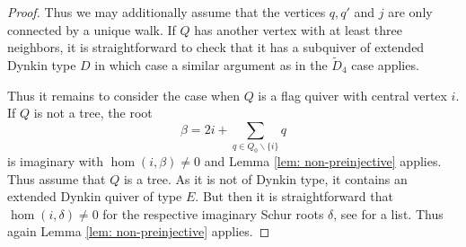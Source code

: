 \documentclass{amsart}
\newcommand{\sayT}[1]{\say[T]{#1}}
\numberwithin{equation}{section}
\begin{document}
\begin{proof}
  Thus we may additionally assume that the vertices $q,q'$ and $j$ are only connected by a unique walk.
  If $Q$ has another vertex with at least three neighbors, it is straightforward to check that it has a subquiver of extended Dynkin type $D$ in which case a similar argument as in the $\tilde D_4$ case applies.\sayT{more precise}

  Thus it remains to consider the case when $Q$ is a flag quiver with central vertex $i$.
  If $Q$ is not a tree, the root 
  $$\beta=2i+\sum_{q\in Q_0\backslash\{i\}}q$$
  is imaginary with $\hom(i,\beta)\neq 0$ and Lemma \ref{lem: non-preinjective} applies.
  Thus assume that $Q$ is a tree.
  As it is not of Dynkin type, it contains an extended Dynkin quiver of type $E$.
  But then it is straightforward that $\hom(i,\delta)\neq 0$ for the respective imaginary Schur roots $\delta$, see \cite[Section 4]{CB} for a list.
  Thus again Lemma \ref{lem: non-preinjective} applies.
\end{proof}
\end{document}
